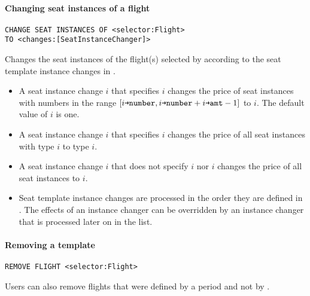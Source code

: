 \paragraph{Changing seat instances of a flight}
\begin{operation}
  \begin{lstlisting}
CHANGE SEAT INSTANCES OF <selector:Flight>
TO <changes:[SeatInstanceChanger]>
  \end{lstlisting}
\end{operation}
Changes the seat instances of the flight(s) selected by
 according to the seat template instance changes in .
\begin{itemize}
  \item A seat instance change $i$ that specifies $i$ changes the
    price of seat instances with numbers in the range
    $[i\texttt{→number},i\texttt{→number}+i\texttt{→amt}-1]$ to $i$.  The
    default value of $i$ is one.

  \item A seat instance change $i$ that specifies $i$ changes the
    price of all seat instances with type $i$ to type $i$.

  \item A seat instance change $i$ that does not specify $i$
    nor $i$ changes the price of all seat instances to
    $i$.

  \item Seat template instance changes are processed in the order they are
    defined in . The effects of an instance changer can be overridden
    by an instance changer that is processed later on in the list.
\end{itemize}

\paragraph{Removing a template}
\begin{operation}
  \begin{lstlisting}
REMOVE FLIGHT <selector:Flight>
  \end{lstlisting}
\end{operation}
Users can also remove flights that were defined by a period and not by
.


